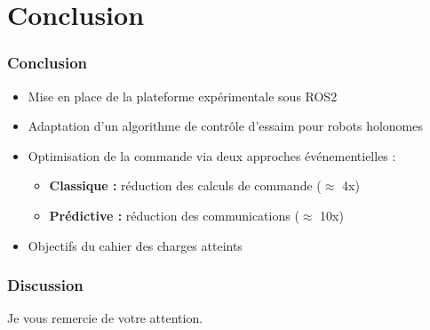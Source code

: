 \section{Conclusion}

\begin{frame}
    \frametitle{Conclusion}
    \begin{itemize}
        \item Mise en place de la plateforme expérimentale sous ROS2
        \item Adaptation d'un algorithme de contrôle d'essaim pour robots holonomes
        \item Optimisation de la commande via deux approches événementielles :
        \begin{itemize}
            \item \textbf{Classique :} réduction des calculs de commande ($\approx$ 4x)
            \item \textbf{Prédictive :} réduction des communications ($\approx$ 10x)
        \end{itemize}
        \item Objectifs du cahier des charges atteints
    \end{itemize}
\end{frame}



\begin{frame}
    \frametitle{Discussion}
    \begin{center}
         \Large Je vous remercie de votre attention.
                
    \end{center}
\end{frame}
